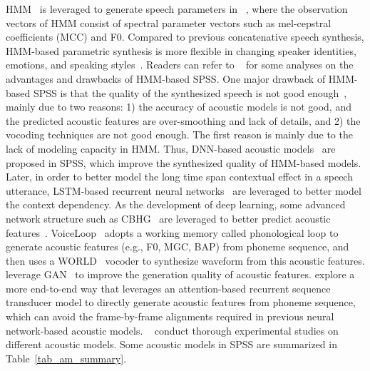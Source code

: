 \documentclass{article}
\begin{document}
HMM~\cite{rabiner1986introduction} is leveraged to generate speech parameters in ~\citet{yoshimura1999simultaneous,tokuda2000speech}, where the observation vectors of HMM consist of spectral parameter vectors such as mel-cepstral coefficients (MCC) and F0. Compared to previous concatenative speech synthesis, HMM-based parametric synthesis is more flexible in changing speaker identities, emotions, and speaking styles~\cite{tokuda2000speech}. Readers can refer to ~\citet{zen2015acoustic,zen2009statistical,tokuda2013speech} for some analyses on the advantages and drawbacks of HMM-based SPSS. One major drawback of HMM-based SPSS is that the quality of the synthesized speech is not good enough~\cite{zen2009statistical,tokuda2013speech}, mainly due to two reasons: 1) the accuracy of acoustic models is not good, and the predicted acoustic features are over-smoothing and lack of details, and 2) the vocoding techniques are not good enough. The first reason is mainly due to the lack of modeling capacity in HMM. Thus, DNN-based acoustic models~\cite{zen2013statistical} are proposed in SPSS, which improve the synthesized quality of HMM-based models. Later, in order to better model the long time span contextual effect in a speech utterance, LSTM-based recurrent neural networks~\cite{fan2014tts} are leveraged to better model the context dependency. As the development of deep learning, some advanced network structure such as CBHG~\cite{wang2017tacotron} are leveraged to better predict acoustic features~\cite{li2018emphasis}. VoiceLoop~\cite{taigman2018voiceloop} adopts a working memory called phonological loop to generate acoustic features (e.g., F0, MGC, BAP) from phoneme sequence, and then uses a WORLD~\cite{morise2016world} vocoder to synthesize waveform from this acoustic features. \citet{yang2017statistical} leverage GAN~\cite{goodfellow2014generative} to improve the generation quality of acoustic features. \citet{wang2016first} explore a more end-to-end way that leverages an attention-based recurrent sequence transducer model to directly generate acoustic features from phoneme sequence, which can avoid the frame-by-frame alignments required in previous neural network-based acoustic models. ~\citet{wang2018comparison} conduct thorough experimental studies on different acoustic models. Some acoustic models in SPSS are summarized in Table~\ref{tab_am_summary}.
\end{document}
